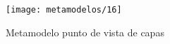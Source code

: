    \begin{figure}[H]
   	\centering
   	\texttt{[image: metamodelos/16]}
   	\captionsetup{width=.95\textwidth}
   	\caption{Metamodelo punto de vista de capas \cite{ref9}}
   	\label{metamodelo16}
   \end{figure}
   

